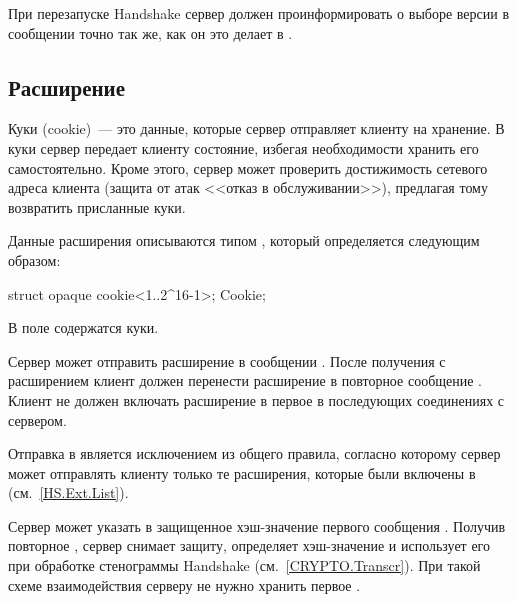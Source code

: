 При перезапуске Handshake сервер должен проинформировать о выборе версии в
сообщении  точно так же, как он это делает в
.


\subsection{Расширение }\label{HS.Ext.c}

Куки (cookie)~--- это данные, которые сервер отправляет клиенту на хранение. 
%
В куки сервер передает клиенту состояние, избегая необходимости хранить его 
самостоятельно.
%
Кроме этого, сервер может проверить достижимость сетевого адреса клиента 
(защита от атак <<отказ в обслуживании>>), предлагая тому возвратить присланные 
куки.

Данные расширения  описываются типом , который 
определяется следующим образом:

\begin{codeblock}
struct {
  opaque cookie<1..2^16-1>;
} Cookie;
\end{codeblock}

В поле  содержатся куки.

Сервер может отправить расширение  в сообщении
. 
%
После получения  с расширением  
клиент должен перенести расширение в повторное сообщение 
.
%
Клиент не должен включать расширение в первое  в 
последующих соединениях с сервером.

\begin{note}
Отправка  в  является исключением 
из общего правила, согласно которому сервер может отправлять клиенту только те 
расширения, которые были включены в 
(см.~\ref{HS.Ext.List}).
\end{note}

Сервер может указать в  защищенное хэш-значение первого 
сообщения . Получив повторное 
, сервер снимает защиту, определяет хэш-значение и   
использует его при обработке стенограммы Handshake (см.~\ref{CRYPTO.Transcr}).
%
При такой схеме взаимодействия серверу не нужно хранить первое 
. 

\begin{note}
\end{note}

